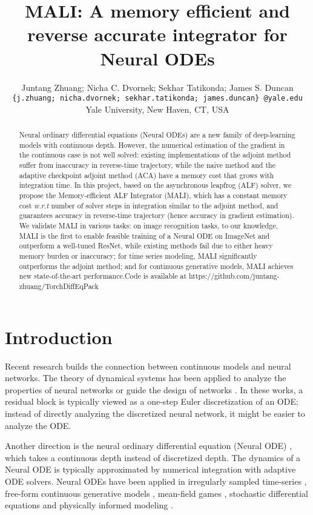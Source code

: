 \documentclass{article} \usepackage{iclr2021_conference,times}
\title{MALI: A memory efficient and reverse accurate integrator for Neural ODEs}
\author{Juntang Zhuang; Nicha C. Dvornek; Sekhar Tatikonda; James S. Duncan \\
\texttt{\{j.zhuang; nicha.dvornek; sekhar.tatikonda; james.duncan\} @yale.edu} \\
Yale University, New Haven, CT, USA
}
\begin{document}
\maketitle

\begin{abstract}
Neural ordinary differential equations (Neural ODEs) are a new family of deep-learning models with continuous depth. 
However, the numerical estimation of the gradient in the continuous case is not well solved: existing implementations of the adjoint method suffer from inaccuracy in reverse-time trajectory, while the naive method and the adaptive checkpoint adjoint method (ACA) have a memory cost that grows with integration time. In this project, based on the asynchronous leapfrog (ALF) solver, we propose the Memory-efficient ALF Integrator (MALI), which has a constant memory cost \textit{w.r.t} number of solver steps in integration similar to the adjoint method, and guarantees accuracy in reverse-time trajectory (hence accuracy in gradient estimation). We validate MALI in various tasks: on image recognition tasks, to our knowledge, MALI is the first to enable feasible training of a Neural ODE on ImageNet and outperform a well-tuned ResNet, 
while existing methods fail due to either heavy memory burden or inaccuracy; for time series modeling, MALI significantly outperforms the adjoint method; and for continuous generative models, MALI achieves new state-of-the-art performance.Code is available at https://github.com/juntang-zhuang/TorchDiffEqPack
\end{abstract}

\section{Introduction}
Recent research builds the connection between continuous models and neural networks. The theory of dynamical systems has been applied to analyze the properties of neural networks or guide the design of networks \citep{weinan2017proposal, ruthotto2019deep, lu2018beyond}. In these works, a residual block \citep{he2016deep} is typically viewed as a one-step Euler discretization of an ODE; instead of directly analyzing the discretized neural network, it might be easier to analyze the ODE. 

Another direction is the neural ordinary differential equation (Neural ODE) \citep{chen2018neural}, which takes a continuous depth instead of discretized depth. The dynamics of a Neural ODE is typically approximated by numerical integration with adaptive ODE solvers. Neural ODEs have been applied in irregularly sampled time-series \citep{rubanova2019latent}, free-form continuous generative models \citep{grathwohl2018ffjord, finlay2020train}, mean-field games \citep{ruthotto2020machine}, stochastic differential equations \citep{li2020scalable} and physically informed modeling \citep{sanchez2019hamiltonian, zhong2019symplectic}.
\end{document}
